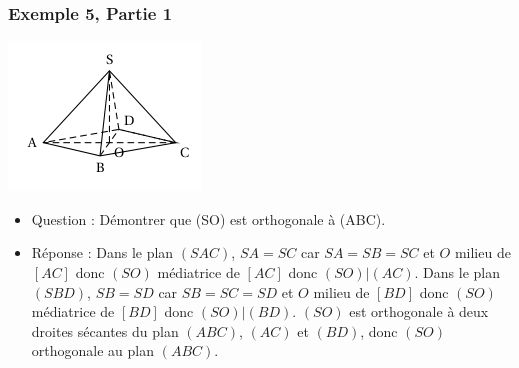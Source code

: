 \documentclass[xcolor=svgnames,t,final]{beamer}
\begin{document}
\begin{frame}

\label{exemple5}

\frametitle{Exemple 5, Partie 1}


\begin{center}
\includegraphics[scale=0.5]{images/exemple5.png}
\end{center}

\begin{itemize}
\pause \item {\color{blue} Question : Démontrer
que  (SO) est orthogonale à (ABC).}
\pause \item {\color{red} Réponse :  Dans le plan $(SAC)$, $SA=SC$  car $SA=SB=SC$ et $O$ milieu de $[AC]$ donc $(SO)$ médiatrice de $[AC]$ donc $(SO) \vert (AC)$. Dans le plan $(SBD)$, $SB=SD$  car $SB=SC=SD$ et $O$ milieu de $[BD]$ donc $(SO)$ médiatrice de $[BD]$ donc $(SO) \vert (BD)$. $(SO)$ est orthogonale à deux droites sécantes du plan  $(ABC)$,  $(AC)$ et $(BD)$, donc $(SO)$ orthogonale au plan $(ABC)$.
}
\end{itemize}



\end{frame}
\end{document}
